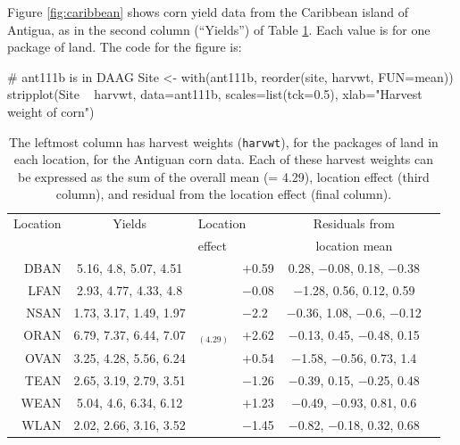 \documentclass{tufte-book}\usepackage[]{graphicx}\usepackage[]{color}
\newcommand{\txtt}[1]{\texttt{#1}}
\begin{document}
Figure \ref{fig:caribbean} shows corn yield data from the Caribbean island of
Antigua, as in the second column (``Yields'') of Table \ref{tab:ant111b}.
Each value is for one package of land.
The code for the figure is:
\begin{Schunk}
\begin{Sinput}
# ant111b is in DAAG
Site <- with(ant111b, reorder(site, harvwt,
                              FUN=mean))
stripplot(Site ~ harvwt, data=ant111b,
          scales=list(tck=0.5),
          xlab="Harvest weight of corn")
\end{Sinput}
\end{Schunk}

\begin{table}
\begin{center}
{\small
\begin{tabular}{@{}rc||r@{\hspace{1mm}}lcc@{}}
\hline
\multicolumn{1}{c}{Location}  & \multicolumn{1}{c}{Yields}  &
\multicolumn{2}{l}{Location} & Residuals from\\
 & & \multicolumn{2}{l}{effect} & \multicolumn{1}{c}{location mean}\\
\hline
DBAN &  5.16, 4.8, 5.07, 4.51 &  \vline& $+$0.59 & 0.28, $-$0.08, 0.18, $-$0.38 \\
LFAN &  2.93, 4.77, 4.33, 4.8 &  \vline& $-$0.08 &  $-$1.28, 0.56, 0.12, 0.59 \\
NSAN & 1.73, 3.17, 1.49, 1.97 &  \vline& $-$2.2 & $-$0.36, 1.08, $-$0.6, $-$0.12 \\
ORAN & 6.79, 7.37, 6.44, 7.07 & $_{(4.29)} $ \vline& $+$2.62 & $-$0.13, 0.45, $-$0.48, 0.15 \\
OVAN & 3.25, 4.28, 5.56, 6.24 &  \vline& $+$0.54 &  $-$1.58, $-$0.56, 0.73, 1.4 \\
TEAN & 2.65, 3.19, 2.79, 3.51 &  \vline& $-$1.26 & $-$0.39, 0.15, $-$0.25, 0.48 \\
WEAN &  5.04, 4.6, 6.34, 6.12 &  \vline& $+$1.23 &  $-$0.49, $-$0.93, 0.81, 0.6 \\
WLAN & 2.02, 2.66, 3.16, 3.52 &  \vline& $-$1.45 & $-$0.82, $-$0.18, 0.32, 0.68 \\
\hline
\end{tabular}
}
\caption{The leftmost column has harvest weights (\txtt{harvwt}), for
  the packages of land in each location, for the Antiguan corn data.  Each of
  these harvest weights can be expressed as the sum of the overall
  mean (= 4.29), location effect (third column), and residual from the
  location effect (final column).
\label{tab:ant111b}}
\end{center}
\vspace*{-0pt}
\end{table}
\vspace*{3pt}
\end{document}
